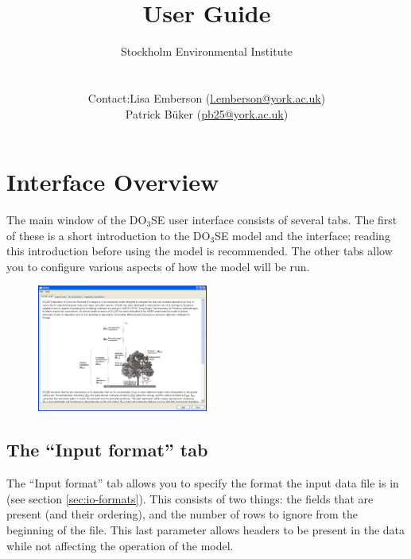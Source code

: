 \documentclass[10pt,a4paper]{article}
\title{\DOSE{} User Guide}
\author{Stockholm Environmental Institute\\
\\
\begin{tabular}{rl}
Contact: & Lisa Emberson (\href{mailto:l.emberson@york.ac.uk}{l.emberson@york.ac.uk})\\
         & Patrick B\"uker (\href{mailto:pb25@york.ac.uk}{pb25@york.ac.uk})
\end{tabular}
}
\date{}
\newcommand{\DOSE}{{DO$_3$SE}}
\begin{document}
\maketitle

\newpage

\tableofcontents

\newpage


\section{Interface Overview}
\label{sec:overview}

The main window of the \DOSE{} user interface consists of several tabs.  The first of these is a 
short introduction to the \DOSE{} model and the interface; reading this introduction before using 
the model is recommended.  The other tabs allow you to configure various aspects of how the model 
will be run.

\begin{figure}[!htb]
\centering
\includegraphics[width=0.5\textwidth]{images/ss/intro-panel}
\end{figure}

\subsection{The ``Input format'' tab}
\label{sec:overview:input}

The ``Input format'' tab allows you to specify the format the input data file is in (see section 
\ref{sec:io-formats}).  This consists of two things: the fields that are present (and their 
ordering), and the number of rows to ignore from the beginning of the file.  This last parameter 
allows headers to be present in the data while not affecting the operation of the model.
\end{document}
